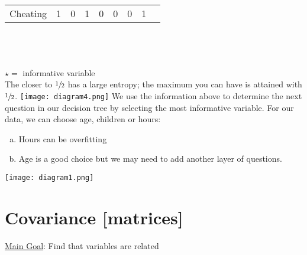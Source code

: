 \documentclass{article}
\theoremstyle{definition}
\begin{document}
\begin{center}
\begin{tabular}{|l||r|r|r|r|r|r|r||r||r|}
        \hline
        Cheating & 1 & 0 & 1 & 0 & 0 & 0 & 1 & \multicolumn{2}{c}{} \\
        \cline{1-8}
      \end{tabular} \\ \ \\ \ \\
      $\star =$ informative variable \\
      The closer to $\sfrac{1}{2}$ has a large entropy; the maximum you can have
      is attained with $\sfrac{1}{2}$.
      \center
      \texttt{[image: diagram4.png]}
      \justify
      We use the information above to determine the next question in our
      decision tree by selecting the most informative variable. For our data,
      we can choose age, children or hours:
      \begin{enumerate}[(a)]
        \item Hours can be overfitting
        \item Age is a good choice but we may need to add another layer of
              questions.
      \end{enumerate}
      \center
      \texttt{[image: diagram1.png]}
      \justify
    \end{center}
  \section{Covariance [matrices]}
    \underline{Main Goal}: Find that variables are related
\end{document}
